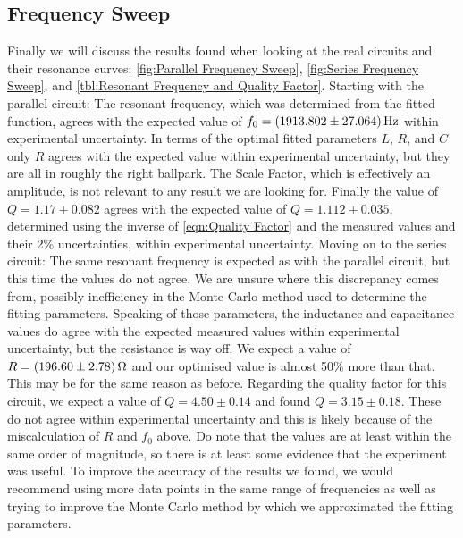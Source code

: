 \documentclass[12pt]{article}
\numberwithin{equation}{section}
\numberwithin{figure}{section}
\begin{document}
    \subsection{Frequency Sweep}\label{sec:Frequency Sweep}
    Finally we will discuss the results found when looking at the real circuits and their resonance 
    curves: \autoref{fig:Parallel Frequency Sweep}, \autoref{fig:Series Frequency Sweep}, and 
    \autoref{tbl:Resonant Frequency and Quality Factor}. \newline
    Starting with the parallel circuit: The resonant frequency, which was determined from the fitted 
    function, agrees with the expected value of $f_0=\SI{1913.802\pm27.064}{\hertz}$ within 
    experimental uncertainty. In terms of the optimal fitted parameters $L$, $R$, and $C$ only $R$ 
    agrees with the expected value within experimental uncertainty, but they are all in roughly the 
    right ballpark. The Scale Factor, which is effectively an amplitude, is not relevant to any result 
    we are looking for. Finally the value of $Q=1.17\pm0.082$ agrees with the expected value of 
    $Q=1.112\pm0.035$, determined using the inverse of \autoref{eqn:Quality Factor} and the measured 
    values and their 2\% uncertainties, within experimental uncertainty. \newline
    Moving on to the series circuit: The same resonant frequency is expected as with the parallel 
    circuit, but this time the values do not agree. We are unsure where this discrepancy comes from, 
    possibly inefficiency in the Monte Carlo method used to determine the fitting parameters. 
    Speaking of those parameters, the inductance and capacitance values do agree with the expected 
    measured values within experimental uncertainty, but the resistance is way off. We expect a value 
    of $R=\SI{196.60\pm2.78}{\ohm}$ and our optimised value is almost 50\% more than that. This may be 
    for the same reason as before. Regarding the quality factor for this circuit, we expect a value 
    of $Q=4.50\pm0.14$ and found $Q=3.15\pm0.18$. These do not agree within experimental uncertainty 
    and this is likely because of the miscalculation of $R$ and $f_0$ above. Do note that the values 
    are at least within the same order of magnitude, so there is at least some evidence that the 
    experiment was useful.\newline
    \newline
    To improve the accuracy of the results we found, we would recommend using more data points 
    in the same range of frequencies as well as trying to improve the Monte Carlo method by which 
    we approximated the fitting parameters. 
\end{document}
